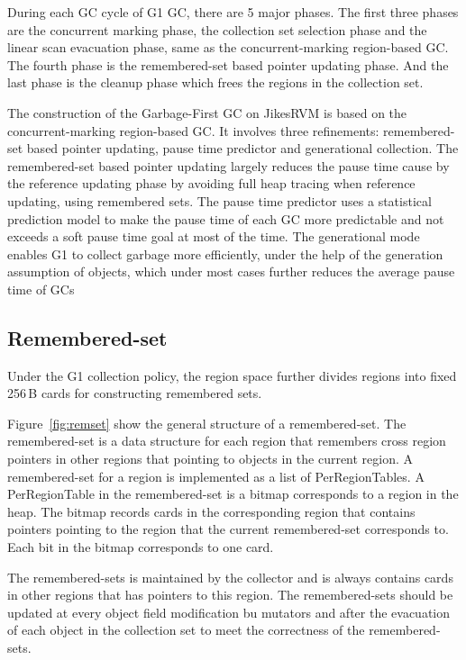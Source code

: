 During each GC cycle of G1 GC, there are 5 major phases.
The first three phases are the concurrent marking phase, the collection
set selection phase and the linear scan evacuation phase,
same as the concurrent-marking region-based GC.
The fourth phase is the remembered-set based pointer updating phase.
And the last phase is the cleanup phase which frees the regions in the collection set.

The construction of the Garbage-First GC on JikesRVM is based on the concurrent-marking
region-based GC.
It involves three refinements: remembered-set based pointer updating, pause time predictor and generational collection.
The remembered-set based pointer updating largely reduces the pause time cause by
the reference updating phase by avoiding full heap tracing when reference updating,
using remembered sets. The pause time predictor uses a statistical prediction model to make the pause time of each
GC more predictable and not exceeds a soft pause time goal at most of the time.
The generational mode enables G1 to collect garbage more efficiently, under the help
of the generation assumption of objects, which under most cases
further reduces the average pause  time of GCs

\subsection{Remembered-set}

Under the G1 collection policy, the region space further divides regions into fixed 256\,B cards for constructing remembered sets.

Figure~\ref{fig:remset} show the general structure of a remembered-set. The remembered-set is a data structure for each region that remembers cross
region pointers in other regions that pointing to objects in the current region.
A remembered-set for a region is implemented as a list of PerRegionTables.
A PerRegionTable in the remembered-set is a bitmap corresponds to a region in the heap.
The bitmap records cards in the corresponding region that contains pointers pointing to the
region that the current remembered-set corresponds to. Each bit in the bitmap corresponds to one card.

\begin{figure*}
  \centering
  \texttt{[image: \{figs/remset.png]}}
  \caption{Remembered-Set Structure}
  \label{fig:remset}
\end{figure*}

The remembered-sets is maintained by the collector and is always contains cards in other regions that has pointers to this region.
The remembered-sets should be updated at every object field modification bu mutators and after
the evacuation of each object in the collection set to meet the correctness of the remembered-sets.

